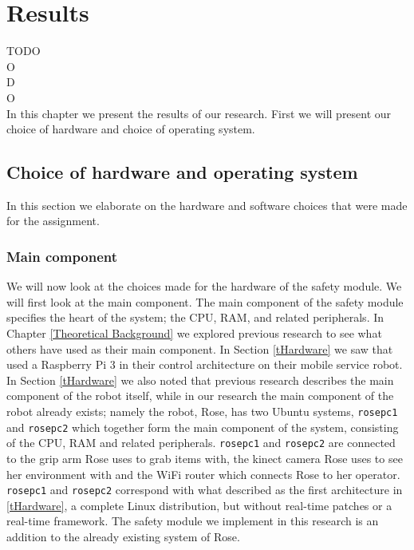\documentclass[12pt]{scrreprt}
\begin{document}
\chapter{Results}
TODO\\
O\\
D\\
O\\
In this chapter we present the results of our research. First we will present our choice of hardware and choice of operating system.

\section{Choice of hardware and operating system}
\label{Choice of hardware and software}
In this section we elaborate on the hardware and software choices that were made for the assignment.

\subsection{Main component}
\label{Main component}
We will now look at the choices made for the hardware of the safety module. We will first look at the main component. The main component of the safety module specifies the heart of the system; the CPU, RAM, and related peripherals. In Chapter \ref{Theoretical Background} we explored previous research to see what others have used as their main component. In Section \ref{tHardware} we saw that \citeauthor{delgado} used a Raspberry Pi 3 in their control architecture on their mobile service robot. In Section  \ref{tHardware} we also noted that previous research describes the main component of the robot itself, while in our research the main component of the robot already exists; namely the robot, Rose, has two Ubuntu systems, \texttt{rosepc1} and \texttt{rosepc2} which together form the main component of the system, consisting of the CPU, RAM and related peripherals. \texttt{rosepc1} and \texttt{rosepc2} are connected to the grip arm Rose uses to grab items with, the kinect camera Rose uses to see her environment with and the WiFi router which connects Rose to her operator. \texttt{rosepc1} and \texttt{rosepc2} correspond with what \citeauthor{bouchier} described as the first architecture in \ref{tHardware}, a complete Linux distribution, but without real-time patches or a real-time framework. The safety module we implement in this research is an addition to the already existing system of Rose.\\
\end{document}
